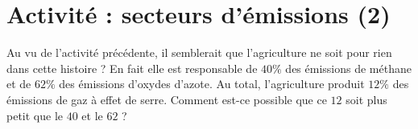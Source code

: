 
\section*{Activité : secteurs d'émissions (2)}

Au vu de l'activité précédente, il semblerait que l'agriculture ne soit pour rien dans cette histoire ? En fait elle est responsable de \( 40\%\) des émissions de méthane et de \( 62\%\) des émissions d'oxydes d'azote. Au total, l'agriculture produit \( 12\%\) des émissions de gaz à effet de serre. Comment est-ce possible que ce \( 12\) soit plus petit que le \( 40\) et le \( 62\) ?
